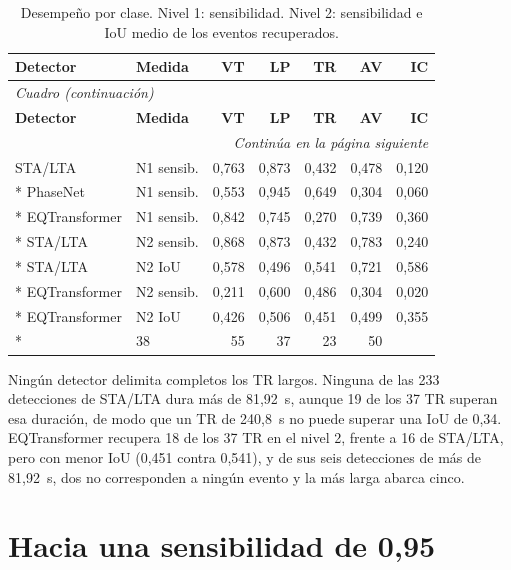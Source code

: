 \documentclass[12pt,oneside,spanish,oldfontcommands]{memoir}
\begin{document}
{\small
\begin{longtable}{llrrrrr}
\caption{Desempeño por clase. Nivel 1: sensibilidad. Nivel 2: sensibilidad e IoU medio de los eventos recuperados.}\label{tab:por-clase}\\
\toprule
\textbf{Detector} & \textbf{Medida} & \textbf{VT} & \textbf{LP} & \textbf{TR} & \textbf{AV} & \textbf{IC} \\
\midrule
\endfirsthead
\multicolumn{7}{l}{\itshape Cuadro \thetable{} (continuación)}\\
\toprule
\textbf{Detector} & \textbf{Medida} & \textbf{VT} & \textbf{LP} & \textbf{TR} & \textbf{AV} & \textbf{IC} \\
\midrule
\endhead
\midrule
\multicolumn{7}{r}{\itshape Continúa en la página siguiente}\\
\endfoot
\bottomrule
\endlastfoot
STA/LTA & N1 sensib. & 0,763 & 0,873 & 0,432 & 0,478 & 0,120 \\*
PhaseNet & N1 sensib. & 0,553 & 0,945 & 0,649 & 0,304 & 0,060 \\*
EQTransformer & N1 sensib. & 0,842 & 0,745 & 0,270 & 0,739 & 0,360 \\*
\midrule\nopagebreak
STA/LTA & N2 sensib. & 0,868 & 0,873 & 0,432 & 0,783 & 0,240 \\*
STA/LTA & N2 IoU & 0,578 & 0,496 & 0,541 & 0,721 & 0,586 \\*
EQTransformer & N2 sensib. & 0,211 & 0,600 & 0,486 & 0,304 & 0,020 \\*
EQTransformer & N2 IoU & 0,426 & 0,506 & 0,451 & 0,499 & 0,355 \\*
\midrule\nopagebreak
\multicolumn{2}{l}{Eventos del catálogo} & 38 & 55 & 37 & 23 & 50 \\
\end{longtable}
}

Ningún detector delimita completos los TR largos. Ninguna de las 233
detecciones de STA/LTA dura más de 81,92~s, aunque 19 de los 37 TR superan esa
duración, de modo que un TR de 240,8~s no puede superar una IoU de 0,34.
EQTransformer recupera 18 de los 37 TR en el nivel 2, frente a 16 de STA/LTA,
pero con menor IoU (0,451 contra 0,541), y de sus seis detecciones de más de
81,92~s, dos no corresponden a ningún evento y la más larga abarca cinco.

\section{Hacia una sensibilidad de 0,95}
\label{sec:det-meta}
\end{document}
